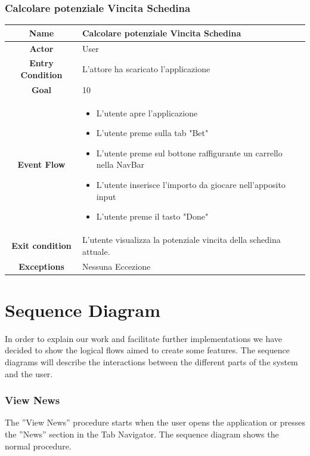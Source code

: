 \documentclass[numbers=noenddot, 12pt, a4paper, oneside]{scrbook}
\begin{document}
\subsection*{Calcolare potenziale Vincita Schedina}
\begin{tabular}{|c|p{}|}
	\hline
	\parbox[c][6ex]{6ex}{\centering \textbf{Name}} & Calcolare potenziale Vincita Schedina\\
	\hline
	\parbox[c][6ex]{6ex}{\centering \textbf{Actor}} & User \\
	\hline
	\parbox[c][10ex]{15ex}{\centering \textbf{Entry Condition}} & L'attore ha scaricato l'applicazione\\
	\hline
	\parbox[c][6ex]{15ex}{\centering \textbf{Goal}} &  10\\
	\hline
	\parbox[c][10ex]{12ex}{\centering \textbf{Event Flow}} & \begin{itemize}
		\item L'utente apre l'applicazione
		\item L'utente preme sulla tab "Bet"
		\item L'utente preme sul bottone raffigurante un carrello nella NavBar
		\item L'utente inserisce l'importo da giocare nell'apposito input
		\item L'utente preme il tasto "Done"
	\end{itemize}\\
	\hline
	\parbox[c][7ex]{12ex}{\centering \textbf{Exit condition}} & L'utente visualizza la potenziale vincita della schedina attuale.\\\hline
	\parbox[c][10ex]{13ex}{\centering \textbf{Exceptions}} & Nessuna Eccezione \\ \hline	
\end{tabular}

\chapter{Sequence Diagram}
In order to explain our work and facilitate further implementations we have decided to show the logical flows aimed to create some features. The sequence diagrams will describe the interactions between the different parts of the system and the user.
\subsection*{View News}
The ”View News” procedure starts when the user opens the application or presses the ”News” section in the Tab Navigator. The sequence diagram shows the normal procedure.
\end{document}
